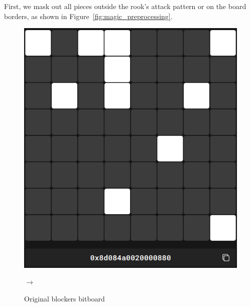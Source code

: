 \noindent First, we mask out all pieces outside the rook's attack pattern or on the board borders, as shown in Figure~\ref{fig:magic_preprocessing}.

\begin{figure}[H]
    \centering
    \begin{minipage}[c]{0.4\textwidth}
        \centering
        \includegraphics[width=\textwidth]{Imagenes/magics_blockers.png}
        \caption*{Original blockers bitboard}
    \end{minipage}
    \hfill
    \begin{minipage}[c]{0.1\textwidth}
        \centering
        \small$\to$
    \end{minipage}
    \hfill
    \begin{minipage}[c]{0.4\textwidth}
        \centering

\end{minipage}
\end{figure}
